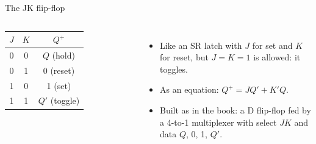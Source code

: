 \documentclass[10pt]{wosm-slides}
\begin{document}
\begin{frame}{The JK flip-flop}
  \begin{columns}[c, totalwidth=\textwidth]
      \centering
      \begin{tabular}{@{}cc|c@{}}
        $J$ & $K$ & $Q^{+}$ \\
        \midrule
        0 & 0 & $Q$ (hold) \\
        0 & 1 & 0 (reset) \\
        1 & 0 & 1 (set) \\
        1 & 1 & $Q'$ (toggle) \\
      \end{tabular}\par\medskip
      \begin{itemize}
        \item Like an SR latch with $J$ for set and $K$ for reset, but $J = K = 1$ is
          allowed: it toggles.
        \item As an equation: $Q^{+} = J Q' + K' Q$.
        \item Built as in the book: a D flip-flop fed by a 4-to-1 multiplexer with
          select $JK$ and data $Q$, 0, 1, $Q'$.
      \end{itemize}
  \end{columns}

  \begin{center}
  \end{center}
\end{frame}
\end{document}
